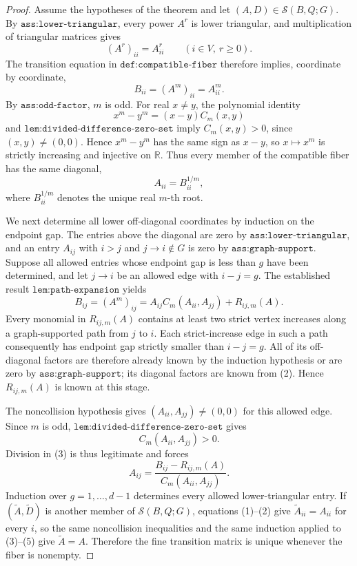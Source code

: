 \documentclass{article}
\begin{document}
\begin{proof}
Assume the hypotheses of the theorem and let \((A,D)\in\mathcal S(B,Q;G)\).  By \(\texttt{ass:lower-triangular}\), every power \(A^r\) is lower triangular, and multiplication of triangular matrices gives
\[
(A^r)_{ii}=A_{ii}^r \qquad (i\in V,\ r\geq 0).
\]
The transition equation in \(\texttt{def:compatible-fiber}\) therefore implies, coordinate by coordinate,
\[
B_{ii}=(A^m)_{ii}=A_{ii}^m. \tag{1}
\]
By \(\texttt{ass:odd-factor}\), \(m\) is odd.  For real \(x\neq y\), the polynomial identity
\[
x^m-y^m=(x-y)C_m(x,y)
\]
and \(\texttt{lem:divided-difference-zero-set}\) imply \(C_m(x,y)>0\), since \((x,y)\neq(0,0)\).  Hence \(x^m-y^m\) has the same sign as \(x-y\), so \(x\mapsto x^m\) is strictly increasing and injective on \(\mathbb R\).  Thus every member of the compatible fiber has the same diagonal,
\[
A_{ii}=B_{ii}^{1/m}, \tag{2}
\]
where \(B_{ii}^{1/m}\) denotes the unique real \(m\)-th root.

We next determine all lower off-diagonal coordinates by induction on the endpoint gap.  The entries above the diagonal are zero by \(\texttt{ass:lower-triangular}\), and an entry \(A_{ij}\) with \(i>j\) and \(j\to i\notin G\) is zero by \(\texttt{ass:graph-support}\).  Suppose all allowed entries whose endpoint gap is less than \(g\) have been determined, and let \(j\to i\) be an allowed edge with \(i-j=g\).  The established result \(\texttt{lem:path-expansion}\) yields
\[
B_{ij}=(A^m)_{ij}
=A_{ij}C_m(A_{ii},A_{jj})+R_{ij,m}(A). \tag{3}
\]
Every monomial in \(R_{ij,m}(A)\) contains at least two strict vertex increases along a graph-supported path from \(j\) to \(i\).  Each strict-increase edge in such a path consequently has endpoint gap strictly smaller than \(i-j=g\).  All of its off-diagonal factors are therefore already known by the induction hypothesis or are zero by \(\texttt{ass:graph-support}\); its diagonal factors are known from (2).  Hence \(R_{ij,m}(A)\) is known at this stage.

The noncollision hypothesis gives \((A_{ii},A_{jj})\neq(0,0)\) for this allowed edge.  Since \(m\) is odd, \(\texttt{lem:divided-difference-zero-set}\) gives
\[
C_m(A_{ii},A_{jj})>0. \tag{4}
\]
Division in (3) is thus legitimate and forces
\[
A_{ij}
=\frac{B_{ij}-R_{ij,m}(A)}{C_m(A_{ii},A_{jj})}. \tag{5}
\]
Induction over \(g=1,\ldots,d-1\) determines every allowed lower-triangular entry.  If \((\widetilde A,\widetilde D)\) is another member of \(\mathcal S(B,Q;G)\), equations (1)--(2) give \(\widetilde A_{ii}=A_{ii}\) for every \(i\), so the same noncollision inequalities and the same induction applied to (3)--(5) give \(\widetilde A=A\).  Therefore the fine transition matrix is unique whenever the fiber is nonempty.


\end{proof}
\end{document}
